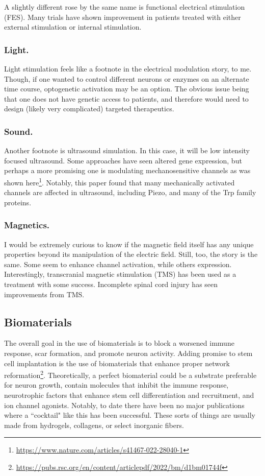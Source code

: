 \documentclass[12pt]{report}
\begin{document}
A slightly different rose by the same name is functional electrical stimulation (FES). Many trials have shown improvement in patients treated with either external stimulation or internal stimulation. 

\subsubsection{Light.}
Light stimulation feels like a footnote in the electrical modulation story, to me. Though, if one wanted to control different neurons or enzymes on an alternate time course, optogenetic activation may be an option. The obvious issue being that one does not have genetic access to patients, and therefore would need to design (likely very complicated) targeted therapeutics. 

\subsubsection{Sound.}
Another footnote is ultrasound simulation. In this case, it will be low intensity focused ultrasound. Some approaches have seen altered gene expression, but perhaps a more promising one is modulating mechanosensitive channels as was shown here\footnote{\url{https://www.nature.com/articles/s41467-022-28040-1}}. Notably, this paper found that many mechanically activated channels are affected in ultrasound, including Piezo, and many of the Trp family proteins. 

\subsubsection{Magnetics.}
I would be extremely curious to know if the magnetic field itself has any unique properties beyond its manipulation of the electric field. Still, too, the story is the same. Some seem to enhance channel activation, while others expression. Interestingly, transcranial magnetic stimulation (TMS) has been used as a treatment with some success. Incomplete spinal cord injury has seen improvements from TMS. 

\subsection{Biomaterials}
The overall goal in the use of biomaterials is to block a worsened immune response, scar formation, and promote neuron activity. Adding promise to stem cell implantation is the use of biomaterials that enhance proper network reformation\footnote{\url{https://pubs.rsc.org/en/content/articlepdf/2022/bm/d1bm01744f}}. Theoretically, a perfect biomaterial could be a substrate preferable for neuron growth, contain molecules that inhibit the immune response, neurotrophic factors that enhance stem cell differentiation and recruitment, and ion channel agonists. Notably, to date there have been no major publications where a ``cocktail" like this has been successful. These sorts of things are usually made from hydrogels, collagens, or select inorganic fibers.\newline
\end{document}
